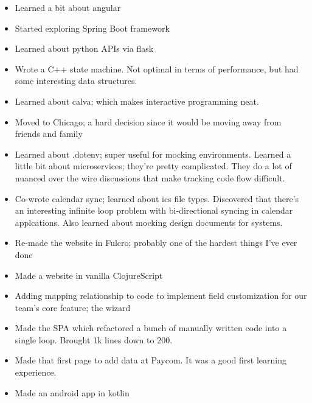 \documentclass[letterpaper,11pt]{article}
\newcommand{\resumeItem}[1]{
  \item\small{
    {#1 \vspace{-2pt}}
  }
}
\newcommand{\resumeItemListStart}{\begin{itemize}}
\newcommand{\resumeItemListEnd}{\end{itemize}\vspace{-5pt}}
\begin{document}
\resumeItemListStart
\resumeItem{ Learned a bit about angular }
\resumeItemListEnd

\resumeItemListStart
\resumeItem{ Started exploring Spring Boot framework }
\resumeItemListEnd

\resumeItemListStart
\resumeItem{ Learned about python APIs via flask }
\resumeItemListEnd

\resumeItemListStart
\resumeItem{ Wrote a C++ state machine. Not optimal in terms
	of performance, but had some interesting data structures. }
\resumeItemListEnd

\resumeItemListStart
\resumeItem{ Learned about calva; which makes interactive
	programming neat. }
\resumeItemListEnd

\resumeItemListStart
\resumeItem{ Moved to Chicago; a hard decision since it would be moving
	away from friends and family }
\resumeItemListEnd

\resumeItemListStart
\resumeItem{ Learned about .dotenv; super useful for mocking environments. Learned
	a little bit about microservices; they're pretty complicated. They do a lot of
	nuanced over the wire discussions that make tracking code flow difficult. }
\resumeItemListEnd

\resumeItemListStart
\resumeItem{ Co-wrote calendar sync; learned about ics file types. Discovered that there's an interesting
	infinite loop problem with bi-directional syncing in calendar applcations. Also learned about
	mocking design documents for systems. }
\resumeItemListEnd

\resumeItemListStart
\resumeItem{ Re-made the website in Fulcro; probably one of the hardest things I've ever done }
\resumeItemListEnd

\resumeItemListStart
\resumeItem{ Made a website in vanilla ClojureScript }
\resumeItemListEnd

\resumeItemListStart
\resumeItem{ Adding mapping relationship to code to implement field customization for our team's core feature; the wizard }
\resumeItemListEnd


\resumeItemListStart
\resumeItem{ Made the SPA which refactored a bunch of manually written code into a single loop. Brought 1k lines down to 200. }
\resumeItemListEnd

\resumeItemListStart
\resumeItem{ Made that first page to add data at Paycom. It was a good first learning experience. }
\resumeItemListEnd

\resumeItemListStart
\resumeItem{ Made an android app in kotlin }
\resumeItemListEnd
\end{document}
